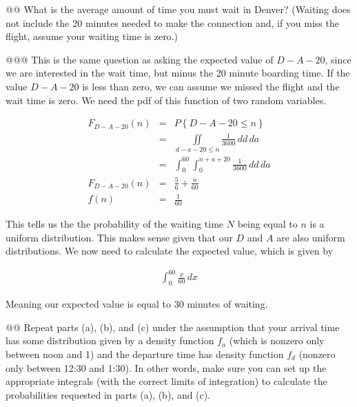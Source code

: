 \documentclass[11pt]{article}\usepackage[]{graphicx}\usepackage[]{xcolor}
\begin{document}
\begin{easylist}[enumerate]
    @@ What is the average amount of time you must wait in Denver? (Waiting does not include the 20 minutes needed to
    make the connection and, if you miss the flight, assume your waiting time is zero.)

    @@@ This is the same question as asking the expected value of $D - A - 20$, since we are interested in the wait
    time, but minus the 20 minute boarding time. If the value $D - A - 20$ is less than zero, we can assume we missed
    the flight and the wait time is zero. We need the pdf of this function of two random variables.

    \begin{equation}
        \begin{aligned}
            F_{D - A - 20}(n) &=& P\left\{ D - A - 20 \le n \right\}\\
                              &=& \iint\limits_{d - a - 20 \le n} \frac{1}{3600} \, dd \, da\\
                              &=& \int_0^{60} \int_0^{n + a + 20} \frac{1}{3600} \, dd\,da\\
            F_{D - A - 20}(n) &=& \frac{5}{6} + \frac{n}{60}\\
            f(n) &=& \frac{1}{60}
        \end{aligned}
    \end{equation}

    This tells us the the probability of the waiting time $N$ being equal to $n$ is a uniform distribution. This makes
    sense given that our $D$ and $A$ are also uniform distributions. We now need to calculate the expected value, which
    is given by

    \begin{equation}
        \begin{aligned}
            \int_0^{60} \frac{x}{60} \, dx
        \end{aligned}
    \end{equation}

    Meaning our expected value is equal to $30$ minutes of waiting.

    @@ Repeat parts (a), (b), and (c) under the assumption that your arrival time has some distribution given by a
    density function $f_a$ (which is nonzero only between noon and 1) and the departure time has density function $f_d$
    (nonzero only between 12:30 and 1:30). In other words, make sure you can set up the appropriate integrals (with the
    correct limits of integration) to calculate the probabilities requested in parts (a), (b), and (c).


\end{easylist}
\end{document}
